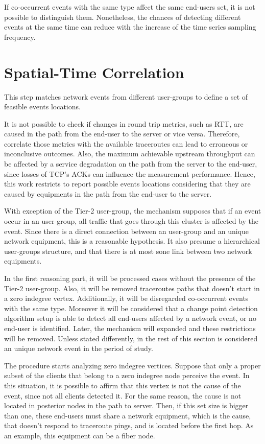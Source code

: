 If co-occurrent events with the same type affect the same end-users set,
it is not possible to distinguish them. Nonetheless, the chances of
detecting different events at the same time can reduce with the increase
of the time series sampling frequency.

\section{Spatial-Time Correlation}
\label{sec:spatial_time_correlation}

This step matches network events from different user-groups to define
a set of feasible events locations.

It is not possible to check if changes in round trip metrics, such as RTT,
are caused in the path from the end-user to the server or vice versa.
Therefore, correlate those metrics with the available traceroutes can lead to
erroneous or inconclusive outcomes. Also, the maximum achievable upstream
throughput can be affected by a service degradation on the path from the server
to the end-user, since losses of TCP's ACKs can influence the measurement
performance.
Hence, this work restricts to report possible events locations considering that
they are caused by equipments in the path from the end-user to the server.

With exception of the Tier-2 user-group, the mechanism supposes that
if an event occur in an user-group,
all traffic that goes through this cluster is affected by the event. Since
there is a direct connection between an user-group and an unique network
equipment, this is a reasonable hypothesis.
It also presume a hierarchical user-groups structure, and that there is at most
sone link between two network equipments.

In the first reasoning part, it will be processed cases without the
presence of the Tier-2 user-group.
Also, it will be removed
traceroutes paths that doesn't start in a zero indegree vertex.
Additionally, it will be disregarded co-occurrent events with the same type.
Moreover it will be considered that
a change point detection algorithm setup is able to detect all end-users
affected by a network event, or no end-user is identified.
Later, the mechanism will expanded and these restrictions will be removed.
Unless stated differently, in the rest of this section is considered an
unique network event in the period of study.

The procedure starts analyzing zero indegree vertices.
Suppose that only a proper subset of the clients that belong to a zero
indegree node perceive the event. In this situation, it is possible to affirm
that this vertex is not the cause of the event, since not all clients detected
it. For the same reason, the cause is not located in posterior nodes
in the path to server.
Then, if this set size is bigger than one, these end-users must share
a network equipment, which is the cause, that doesn't respond to traceroute
pings, and is located before the first hop. As an example,
this equipment can be a fiber node.

